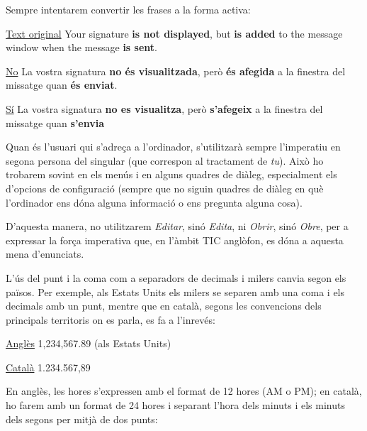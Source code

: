 \documentclass[9pt]{cheatsheet}
\begin{document}
\begin{multicols*}{3}



Sempre intentarem convertir les frases a la forma activa:

\underline {Text original} Your signature \textbf{is not displayed}, but \textbf{is added} to the message window when the message \textbf{is sent}.

\underline {No} La vostra signatura \textbf{no és visualitzada}, però \textbf{és afegida} a la finestra del missatge quan \textbf{és enviat}.

\underline {Sí} La vostra signatura \textbf{no es visualitza}, però \textbf{s'afegeix} a la finestra del missatge quan \textbf{s'envia}




Quan és l’usuari qui s'adreça a l'ordinador, s'utilitzarà sempre l’imperatiu en segona persona del singular (que correspon al tractament de \emph{tu}). Això ho trobarem sovint en els menús i en alguns quadres de diàleg, especialment els d’opcions de configuració (sempre que no siguin quadres de diàleg en què l’ordinador ens dóna alguna informació o ens pregunta alguna cosa).

D’aquesta manera, no utilitzarem \emph{Editar}, sinó \emph{Edita}, ni \emph{Obrir}, sinó \emph{Obre}, per a expressar la força imperativa que, en l’àmbit TIC anglòfon, es dóna a aquesta mena d’enunciats.





L’ús del punt i la coma com a separadors de decimals i milers canvia segon els països. Per exemple, als Estats Units els milers se separen amb una coma i els decimals amb un punt, mentre que en català, segons les convencions dels principals territoris on es parla, es fa a l’inrevés:

\underline {Anglès} 1,234,567.89 (als Estats Units)

\underline {Català} 1.234.567,89



En anglès, les hores s’expressen amb el format de 12 hores (AM o PM); en català, ho farem amb un format de 24 hores i separant l’hora dels minuts i els minuts dels segons per mitjà de dos punts:


\end{multicols*}
\end{document}
